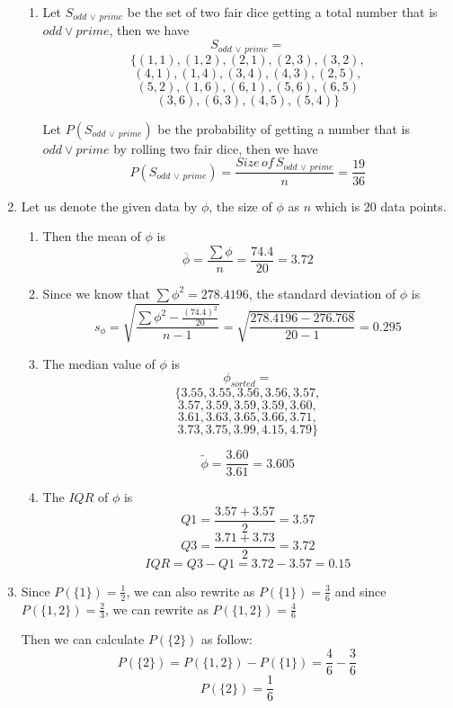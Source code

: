 \documentclass[12pt]{article}
\begin{document}
\begin{enumerate}
\begin{enumerate}
		\item Let $S_{odd \, \lor \, prime}$ be the set of two fair dice getting a total number that is $odd \lor prime$, then we have
		$$S_{odd \, \lor \, prime} =$$ 
		$$\{(1,1), (1,2), (2,1), (2,3), (3,2),$$		
		$$(4,1), (1,4),(3,4), (4,3), (2,5),$$
		$$(5,2), (1,6), (6,1), (5,6), (6,5)$$
		$$(3,6), (6,3), (4,5), (5,4) \}$$
		
		Let $P(S_{odd \, \lor \, prime})$ be the probability of getting a number that is $odd \lor prime$ by rolling two fair dice, then we have
		$$P(S_{odd \, \lor \, prime}) = \frac{Size \, of \, S_{odd \, \lor \, prime}}{n} = \frac{19}{36}$$
		
	\end{enumerate}
	
	\item Let us denote the given data by $\phi$, the size of $\phi$ as $n$ which is 20 data points.
	
	\begin{enumerate}
	
		\item Then the mean of $\phi$ is
		$$\overline{\phi} = \frac{\sum \phi}{n} = \frac{74.4}{20} = 3.72$$
		
		\item Since we know that $\sum \phi^{2} = 278.4196$, the standard deviation of $\phi$ is
		$$s_{\phi} = \sqrt{\frac{\sum \phi^{2} - \frac{(74.4)^2}{20}}{n-1}}= \sqrt{\frac{278.4196 - 276.768}{20-1}} = 0.295$$
		
		\item The median value of $\phi$ is
		$$\phi_{sorted} =$$	
		$$\{3.55, 3.55, 3.56, 3.56, 3.57,$$
		$$3.57, 3.59, 3.59, 3.59, 3.60,$$
		$$3.61, 3.63, 3.65, 3.66, 3.71,$$
		$$3.73, 3.75, 3.99, 4.15, 4.79\}$$
		
		$$\tilde{\phi} = \frac{3.60}{3.61} = 3.605$$
		
		\item The $IQR$ of $\phi$ is
		$$Q1 = \frac{3.57 + 3.57}{2} = 3.57$$
		$$Q3 = \frac{3.71 + 3.73}{2} = 3.72$$
		$$IQR = Q3 - Q1 = 3.72 - 3.57 = 0.15$$
	\end{enumerate}
		
	\item Since $P(\{1\}) = \frac{1}{2}$, we can also rewrite as $P(\{1\}) = \frac{3}{6}$ and since $P(\{1, 2\}) = \frac{2}{3}$, we can rewrite as $P(\{1, 2\}) = \frac{4}{6}$
	
	Then we can calculate $P(\{2\})$ as follow:
	$$P(\{2\}) = P(\{1, 2\}) - P(\{1\}) = \frac{4}{6} - \frac{3}{6}$$
	$$P(\{2\}) = \frac{1}{6}$$
	

\end{enumerate}
\end{document}
